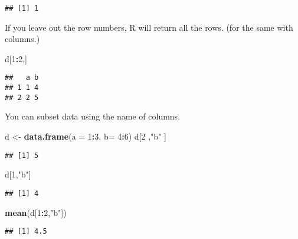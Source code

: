 \documentclass[
]{article}
\newenvironment{Shaded}{\begin{snugshade}}{\end{snugshade}}
\newcommand{\DataTypeTok}[1]{\textcolor[rgb]{0.13,0.29,0.53}{#1}}
\newcommand{\DecValTok}[1]{\textcolor[rgb]{0.00,0.00,0.81}{#1}}
\newcommand{\KeywordTok}[1]{\textcolor[rgb]{0.13,0.29,0.53}{\textbf{#1}}}
\newcommand{\NormalTok}[1]{#1}
\newcommand{\OperatorTok}[1]{\textcolor[rgb]{0.81,0.36,0.00}{\textbf{#1}}}
\newcommand{\StringTok}[1]{\textcolor[rgb]{0.31,0.60,0.02}{#1}}
\begin{document}
\begin{verbatim}
## [1] 1
\end{verbatim}

If you leave out the row numbers, R will return all the rows. (for the
same with columns.)

\begin{Shaded}
\begin{Highlighting}[]
\NormalTok{d[}\DecValTok{1}\OperatorTok{:}\DecValTok{2}\NormalTok{,]}
\end{Highlighting}
\end{Shaded}

\begin{verbatim}
##   a b
## 1 1 4
## 2 2 5
\end{verbatim}

You can subset data using the name of columns.

\begin{Shaded}
\begin{Highlighting}[]
\NormalTok{d <-}\StringTok{ }\KeywordTok{data.frame}\NormalTok{(}\DataTypeTok{a =} \DecValTok{1}\OperatorTok{:}\DecValTok{3}\NormalTok{, }\DataTypeTok{b=} \DecValTok{4}\OperatorTok{:}\DecValTok{6}\NormalTok{)}
\NormalTok{d[}\DecValTok{2}\NormalTok{ ,}\StringTok{"b"}\NormalTok{ ]}
\end{Highlighting}
\end{Shaded}

\begin{verbatim}
## [1] 5
\end{verbatim}

\begin{Shaded}
\begin{Highlighting}[]
\NormalTok{d[}\DecValTok{1}\NormalTok{,}\StringTok{"b"}\NormalTok{]}
\end{Highlighting}
\end{Shaded}

\begin{verbatim}
## [1] 4
\end{verbatim}

\begin{Shaded}
\begin{Highlighting}[]
\KeywordTok{mean}\NormalTok{(d[}\DecValTok{1}\OperatorTok{:}\DecValTok{2}\NormalTok{,}\StringTok{"b"}\NormalTok{])}
\end{Highlighting}
\end{Shaded}

\begin{verbatim}
## [1] 4.5
\end{verbatim}
\end{document}
